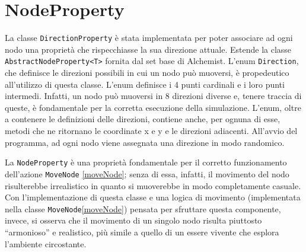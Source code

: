 \section{NodeProperty}
La classe \texttt{DirectionProperty} è stata implementata per poter associare ad ogni nodo una proprietà che rispecchiasse la sua direzione attuale.
Estende la classe \texttt{AbstractNodeProperty<T>} fornita dal set base di Alchemist.
L'enum \texttt{Direction}, che definisce le direzioni possibili in cui un nodo può muoversi, è propedeutico all'utilizzo di questa classe.
L'enum definisce i 4 punti cardinali e i loro punti intermedi. Infatti, un nodo può muoversi in 8 direzioni diverse e, tenere traccia di
queste, è fondamentale per la corretta esecuzione della simulazione. L'enum, oltre a contenere le definizioni delle direzioni, contiene anche,
per ognuna di esse, metodi che ne ritornano le coordinate x e y e le direzioni adiacenti. All'avvio del programma, ad ogni nodo 
viene assegnata una direzione in modo randomico. 

La \texttt{NodeProperty} è una proprietà fondamentale per il corretto funzionamento dell'azione \texttt{MoveNode}
\space\ref{moveNode}; senza di essa, infatti, il movimento del nodo risulterebbe irrealistico in quanto si muoverebbe in modo completamente casuale.
Con l'implementazione di questa classe e una logica di movimento (implementata nella classe \texttt{MoveNode}\space\ref{moveNode})
pensata per sfruttare questa componente, invece,
si osserva che il movimento di un singolo nodo risulta piuttosto ``armonioso'' e realistico, più simile a quello di un essere vivente che 
esplora l'ambiente circostante.

